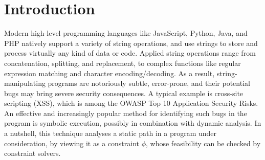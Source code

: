 
\section{Introduction}



%
Modern high-level programming languages like JavaScript, Python, Java,
and PHP natively support a variety of string operations, and use
strings to store and process virtually any kind of data or code.
Applied string operations range from concatenation, splitting, and
replacement, to complex functions like regular expression matching and
character
encoding/decoding.  As a result, string-manipulating programs are
notoriously subtle, error-prone, and their potential bugs may bring
severe security consequences. A typical example is cross-site
scripting (XSS), which is among the OWASP Top 10 Application Security
Risks.
An effective and increasingly popular method for identifying such bugs
in the program is symbolic execution, possibly in combination with dynamic
analysis. In a nutshell, this technique analyses a static path in
a program under consideration, by viewing it as a constraint $\phi$, whose 
feasibility can be checked by constraint solvers.

